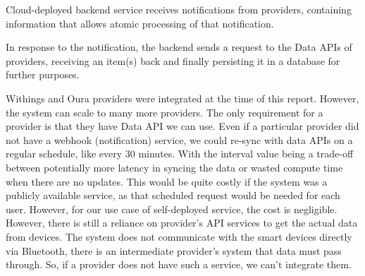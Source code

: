 Cloud-deployed backend service receives notifications from providers, containing information that allows atomic processing of that notification. 

In response to the notification, the backend sends a request to the Data APIs of providers, receiving an item(s) back and finally persisting it in a database for further purposes. 

Withings and Oura providers were integrated at the time of this report. However, the system can scale to many more providers. The only requirement for a provider is that they have Data API we can use. Even if a particular provider did not have a webhook (notification) service, we could re-sync with data APIs on a regular schedule, like every 30 minutes. With the interval value being a trade-off between potentially more latency in syncing the data or wasted compute time when there are no updates. This would be quite costly if the system was a publicly available service, as that scheduled request would be needed for each user. However, for our use case of self-deployed service, the cost is negligible. However, there is still a reliance on provider's API services to get the actual data from devices. The system does not communicate with the smart devices directly via Bluetooth, there is an intermediate provider's system that data must pass through. So, if a provider does not have such a service, we can't integrate them.

